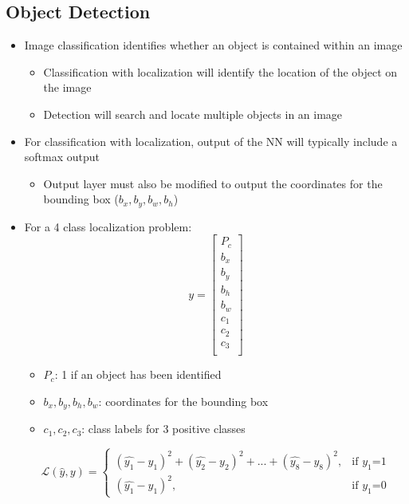 \documentclass[12pt, letterpaper]{article}
\begin{document}
    \subsection{Object Detection}
    \begin{itemize}
        \item Image classification identifies whether an object is contained within an image
        \begin{itemize}
            \item Classification with localization will identify the location of the object on the image
            \item Detection will search and locate multiple objects in an image
        \end{itemize}
        \item For classification with localization, output of the NN will typically include a softmax output
        \begin{itemize}
            \item Output layer must also be modified to output the coordinates for the bounding box ($b_x, b_y, b_w, b_h$)
        \end{itemize}
        \item For a 4 class localization problem:
        $$y=\begin{bmatrix}
            P_c \\
            b_x \\
            b_y \\
            b_h \\
            b_w \\
            c_1 \\
            c_2 \\
            c_3 \\
        \end{bmatrix}$$
        \begin{itemize}
            \item $P_c$: 1 if an object has been identified
            \item $b_x, b_y, b_h, b_w$: coordinates for the bounding box
            \item $c_1, c_2, c_3$: class labels for 3 positive classes
        \end{itemize}
        $$\mathcal{L}(\hat{y}, y)=\begin{cases}
            (\hat{y_1}-y_1)^2+(\hat{y_2}-y_2)^2+...+(\hat{y_8}-y_8)^2,&\text{if $y_1$=1} \\
            (\hat{y_1}-y_1)^2,&\text{if $y_1$=0}

\end{cases}$$
\end{itemize}
\end{document}
